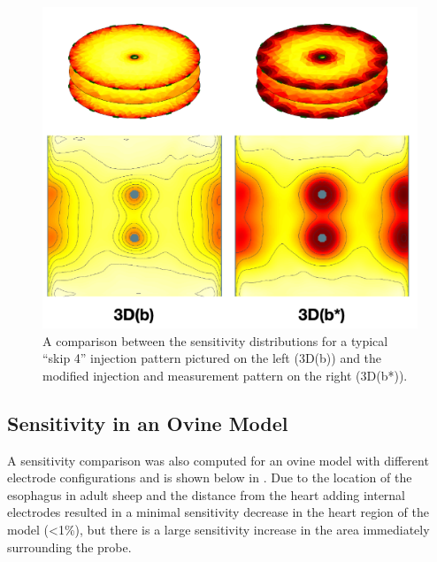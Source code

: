 \begin{figure}
\centering
\includegraphics[width=\textwidth]{chapter6-internal_electrodes/imgs/Injection_Comparison.pdf}
\caption[Sensitivity using internal electrodes with modified injection patterns]{A comparison between the sensitivity distributions for a typical ``skip 4'' injection pattern pictured on the left (3D(b)) and 
the modified injection and measurement pattern on the right (3D(b*)).}
\label{fig:modified_measurement_sens}
\end{figure}

\subsection{Sensitivity in an Ovine Model}

A sensitivity comparison was also computed for an ovine model with different 
electrode configurations 
and is shown below in 
. Due to the location of the esophagus in adult sheep
and the distance from the heart
adding internal electrodes resulted 
in a minimal sensitivity decrease in the 
heart region of the model (<1\%), but there is 
a large sensitivity increase in the area immediately surrounding the 
probe.

